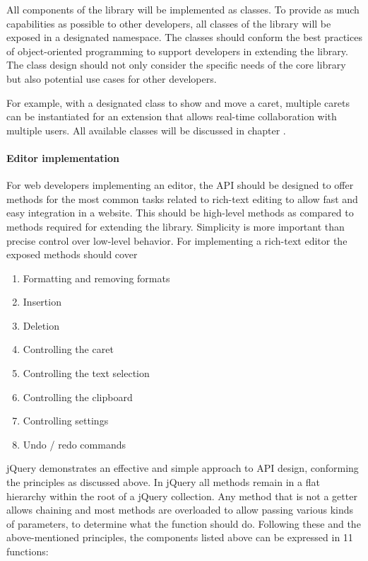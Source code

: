 All components of the library will be implemented as classes. To provide as much capabilities as possible to other developers, all classes of the library will be exposed in a designated namespace. The classes should conform the best practices of object-oriented programming to support developers in extending the library. The class design should not only consider the specific needs of the core library but also potential use cases for other developers.

For example, with a designated class to show and move a caret, multiple carets can be instantiated for an extension that allows real-time collaboration with multiple users. All available classes will be discussed in chapter .

\paragraph{Editor implementation}

For web developers implementing an editor, the API should be designed to offer methods for the most common tasks related to rich-text editing to allow fast and easy integration in a website. This should be high-level methods as compared to methods required for extending the library. Simplicity is more important than precise control over low-level behavior. For implementing a rich-text editor the exposed methods should cover

\begin{enumerate}
\item Formatting and removing formats
\item Insertion
\item Deletion
\item Controlling the caret
\item Controlling the text selection
\item Controlling the clipboard
\item Controlling settings
\item Undo / redo commands
\end{enumerate}

\noindent jQuery demonstrates an effective and simple approach to API design, conforming the principles as discussed above. In jQuery all methods remain in a flat hierarchy within the root of a jQuery collection. Any method that is not a getter allows chaining and most methods are overloaded to allow passing various kinds of parameters, to determine what the function should do. Following these and the above-mentioned principles, the components listed above can be expressed in 11 functions:


